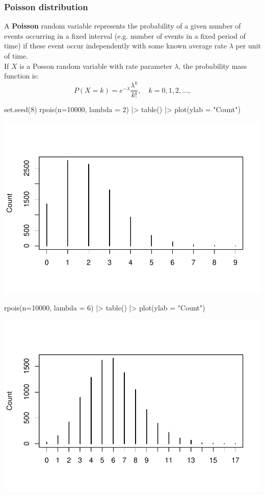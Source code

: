 \documentclass[a4paper]{article}\usepackage[]{graphicx}\usepackage[]{xcolor}
\makeatletter
\def\maxwidth{ %
  \ifdim\Gin@nat@width>\linewidth
    \linewidth
  \else
    \Gin@nat@width
  \fi
}
\makeatother
\begin{document}
\subsubsection{Poisson distribution}
A \textbf{Poisson} random variable represents the probability of a given number of events occurring in a fixed interval (e.g. number of events in a fixed period of time) if these event occur independently with some known average rate \( \lambda \) per unit of time.\\
If \( X \) is a Posson random variable with rate parameter \( \lambda \), the probability mass function is:
\[
	P(X = k) = e^{-\lambda} \frac{\lambda^k}{k!}, \quad k=0,1,2,\dotsc,
\]
\begin{Schunk}
\begin{Sinput}
set.seed(8)
rpois(n=10000, lambda = 2) |>
  table() |>
plot(ylab = "Count")	
\end{Sinput}


{\centering \includegraphics[width=\maxwidth]{figure/listings-unnamed-chunk-31-1} 

}

\begin{Sinput}
rpois(n=10000, lambda = 6) |>
  table() |>
plot(ylab = "Count")
\end{Sinput}


{\centering \includegraphics[width=\maxwidth]{figure/listings-unnamed-chunk-31-2} 

}

\end{Schunk}
\end{document}
